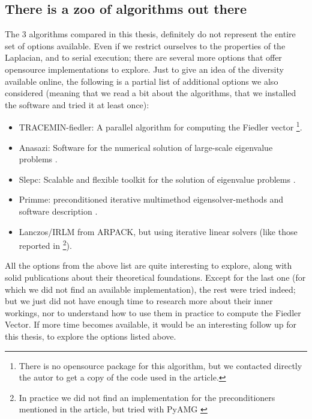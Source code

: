 \subsection{There is a zoo of algorithms out there}

The 3 algorithms compared in this thesis, definitely do not represent
the entire set of options available. Even if we restrict ourselves to
the properties of the Laplacian, and to serial execution; there are
several more options that offer opensource implementations to
explore. Just to give an idea of the diversity available online, the
following is a partial list of additional options we also considered
(meaning that we read a bit about the algorithms, that we installed
the software and tried it at least once):

\begin{itemize}
  \item TRACEMIN-fiedler: A parallel algorithm for computing the
    Fiedler vector \cite{trminfiedler} \footnote{There is no
      opensource package for this algorithm, but we contacted directly
    the autor to get a copy of the code used in the article.}.
  \item Anasazi: Software for the numerical solution of large-scale
    eigenvalue problems \cite{anasazi}.
  \item Slepc: Scalable and flexible toolkit for the solution of
    eigenvalue problems \cite{slepc}.
  \item Primme: preconditioned iterative multimethod
    eigensolver-methods and software description \cite{primme}.
  \item Lanczos/IRLM from ARPACK, but using iterative linear solvers
    (like those reported in \cite{martinez16} \footnote{In practice we
  did not find an implementation for the preconditioners mentioned in
  the article, but tried with PyAMG \cite{pyamg}}). 
\end{itemize}

All the options from the above list are quite interesting to explore, 
along with solid publications about their theoretical
foundations. Except for the last one (for which we did not find an
available implementation), the rest were tried indeed; but we just did
not have enough time to research more about their inner workings, nor
to understand how to use them in practice to compute the Fiedler
Vector. If more time becomes available, it would be an interesting
follow up for this thesis, to explore the options listed above.

